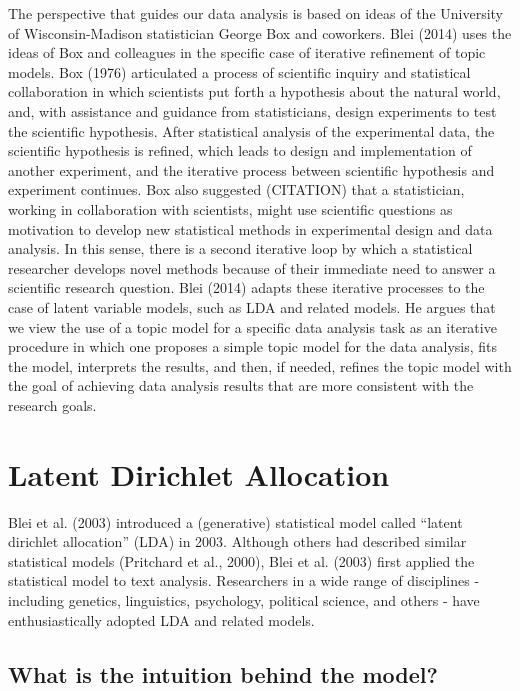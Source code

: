 \documentclass[12pt,]{article}
\begin{document}
The perspective that guides our data analysis is based on ideas of the
University of Wisconsin-Madison statistician George Box and coworkers.
Blei (2014) uses the ideas of Box and colleagues in the specific case of
iterative refinement of topic models. Box (1976) articulated a process
of scientific inquiry and statistical collaboration in which scientists
put forth a hypothesis about the natural world, and, with assistance and
guidance from statisticians, design experiments to test the scientific
hypothesis. After statistical analysis of the experimental data, the
scientific hypothesis is refined, which leads to design and
implementation of another experiment, and the iterative process between
scientific hypothesis and experiment continues. Box also suggested
(CITATION) that a statistician, working in collaboration with
scientists, might use scientific questions as motivation to develop new
statistical methods in experimental design and data analysis. In this
sense, there is a second iterative loop by which a statistical
researcher develops novel methods because of their immediate need to
answer a scientific research question. Blei (2014) adapts these
iterative processes to the case of latent variable models, such as LDA
and related models. He argues that we view the use of a topic model for
a specific data analysis task as an iterative procedure in which one
proposes a simple topic model for the data analysis, fits the model,
interprets the results, and then, if needed, refines the topic model
with the goal of achieving data analysis results that are more
consistent with the research goals.

\section{Latent Dirichlet Allocation}\label{latent-dirichlet-allocation}

Blei et al. (2003) introduced a (generative) statistical model called
``latent dirichlet allocation'' (LDA) in 2003. Although others had
described similar statistical models (Pritchard et al., 2000), Blei et
al. (2003) first applied the statistical model to text analysis.
Researchers in a wide range of disciplines - including genetics,
linguistics, psychology, political science, and others - have
enthusiastically adopted LDA and related models.

\subsection{What is the intuition behind the
model?}\label{what-is-the-intuition-behind-the-model}
\end{document}
